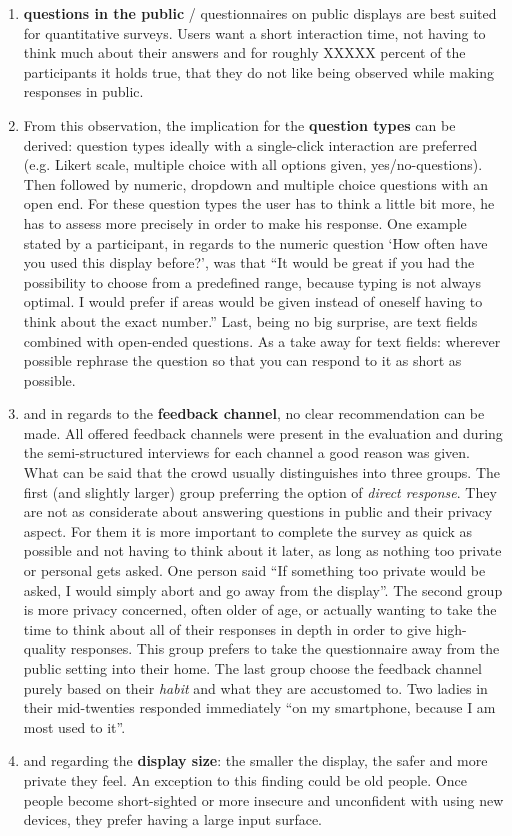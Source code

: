 	\begin{enumerate}
	\item \textbf{questions in the public} / questionnaires on public displays are best suited for quantitative surveys. Users want a short interaction time, not having to think much about their answers and for roughly XXXXX percent of the participants it holds true, that they do not like being observed while making responses in public.

	\item From this observation, the implication for the \textbf{question types} can be derived: question types ideally with a single-click interaction are preferred (e.g. Likert scale, multiple choice with all options given, yes/no-questions). Then followed by numeric, dropdown and multiple choice questions with an open end. For these question types the user has to think a little bit more, he has to assess more precisely in order to make his response. One example stated by a participant, in regards to the numeric question `How often have you used this display before?', was that ``It would be great if you had the possibility to choose from a predefined range, because typing is not always optimal. I would prefer if areas would be given instead of oneself having to think about the exact number.'' Last, being no big surprise, are text fields combined with open-ended questions. As a take away for text fields: wherever possible rephrase the question so that you can respond to it as short as possible.

	\item and in regards to the \textbf{feedback channel}, no clear recommendation can be made. All offered feedback channels were present in the evaluation and during the semi-structured interviews for each channel a good reason was given. What can be said that the crowd usually distinguishes into three groups. The first (and slightly larger) group preferring the option of \textit{direct response}. They are not as considerate about answering questions in public and their privacy aspect. For them it is more important to complete the survey as quick as possible and not having to think about it later, as long as nothing too private or personal gets asked. One person said ``If something too private would be asked, I would simply abort and go away from the display''. The second group is more privacy concerned, often older of age, or actually wanting to take the time to think about all of their responses in depth in order to give high-quality responses. This group prefers to take the questionnaire away from the public setting into their home. The last group choose the feedback channel purely based on their \textit{habit} and what they are accustomed to. Two ladies in their mid-twenties responded immediately ``on my smartphone, because I am most used to it''.

	\item and regarding the \textbf{display size}: the smaller the display, the safer and more private they feel. An exception to this finding could be old people. Once people become short-sighted or more insecure and unconfident with using new devices, they prefer having a large input surface.

	\end{enumerate}


